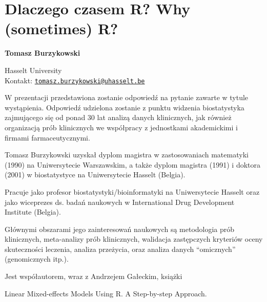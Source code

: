 \documentclass[\main/boa.tex]{subfiles}
\begin{document}
\section{Dlaczego czasem R? Why (sometimes) R?}


\begin{minipage}{0.915\textwidth}
	\centering
  {\bf \huge {} Tomasz Burzykowski}
\end{minipage}


\vskip 0.3cm

\begin{affiliations}
\begin{minipage}{0.915\textwidth}
\centering
\large Hasselt University   \\[5pt]
Kontakt: \href{mailto:tomasz.burzykowski@uhasselt.be}{\nolinkurl{tomasz.burzykowski@uhasselt.be}}\\
\end{minipage}
\end{affiliations}

\vskip 0.8cm

W prezentacji przedstawiona zostanie odpowiedź na pytanie zawarte w tytule wystąpienia. Odpowiedź udzielona zostanie z punktu widzenia biostatystyka zajmującego się od ponad 30 lat analizą danych klinicznych, jak również organizacją prób klinicznych we współpracy z jednostkami akademickimi i firmami farmaceutycznymi. 

\bio
Tomasz Burzykowski uzyskał dyplom magistra w zastosowaniach matematyki (1990) na Uniwersytecie Warszawskim, a także dyplom magistra (1991) i doktora (2001) w biostatystyce na Uniwersytecie Hasselt (Belgia).

Pracuje jako profesor biostatystyki/bioinformatyki na Uniwersytecie Hasselt oraz jako wiceprezes ds. badań naukowych w International Drug Development Institute (Belgia).

Głównymi obszarami jego zainteresowań naukowych są metodologia prób klinicznych, meta-analizy prób klinicznych, walidacja zastępczych kryteriów oceny skuteczności leczenia, analiza przeżycia, oraz analiza danych “omicznych” (genomicznych itp.).

Jest współautorem, wraz z Andrzejem Gałeckim, książki

Linear Mixed-effects Models Using R. A Step-by-step Approach.
\end{document}

